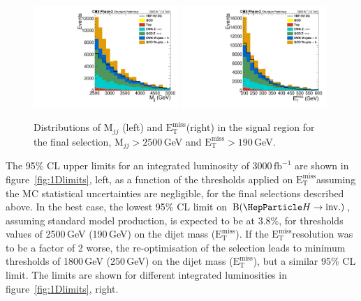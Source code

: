 \documentclass[../report.tex]{subfiles}
\newcommand{\MET}{\ensuremath{\mathrm{E}_{\mathrm{T}}^{\mathrm{miss}}}}
\newcommand{\BHinv}{\ensuremath{\text{B}(\PH\to \text{inv.})}\xspace}
\newcommand{\fbinv}{\ensuremath{\,\text{fb}^{-1}\xspace}}
\begin{document}
\begin{figure}[htbp]
  \centering
    \includegraphics[width=0.49\textwidth]{Mjj_200PU_cor}
    \includegraphics[width=0.49\textwidth]{metnolep_200PU_cor}
\caption{Distributions of M$_{jj}$ (left) and \MET (right) in the signal region for the final selection, M$_{jj}>2500$\,GeV and \MET$>190$\,GeV.}
  \label{fig:plotsdijetmet}
\end{figure}

The 95\% CL upper limits for an integrated luminosity of 3000\fbinv
are shown in figure~\ref{fig:1Dlimits}, left, as a function of the
thresholds applied on \MET assuming the MC statistical uncertainties
are negligible, for the final selections described above. In the best
case, the lowest 95\% CL limit on \BHinv, assuming standard model
production, is expected to be at 3.8\%, for thresholds values of
2500\,GeV (190\,GeV) on the dijet mass (\MET). If the \MET resolution
was to be a factor of 2 worse, the re-optimisation of the selection
leads to minimum thresholds of 1800\,GeV (250\,GeV) on the dijet mass
(\MET), but a similar 95\% CL limit. The limits are shown for
different integrated luminosities in figure~\ref{fig:1Dlimits}, right.
\end{document}
